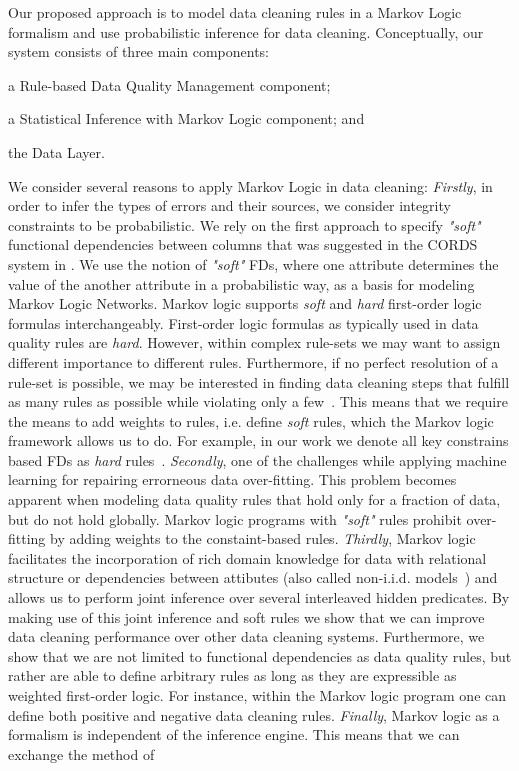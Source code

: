 Our proposed approach is to model data cleaning rules in a Markov Logic~\cite{domingos2009markov} formalism and use probabilistic inference 
for data cleaning. Conceptually, our system consists of three main components: 
\begin{inparaenum}
\item a Rule-based Data Quality Management component;
\item a Statistical Inference with Markov Logic component; and
\item the Data Layer.
\end{inparaenum}
We consider several reasons to apply Markov Logic in data cleaning: \textit{Firstly}, in order to infer the types of errors and their sources, we consider integrity constraints to be probabilistic. We rely on the first approach to specify \textit{"soft"} functional dependencies between columns that was suggested in the \textsc{CORDS} system in \cite{Ilyas:2004:CAD:1007568.1007641}. We use the notion of \textit{"soft"} FDs, where one attribute determines the value of the another attribute in a probabilistic way, as a basis for modeling Markov Logic Networks. Markov logic supports \textit{soft} and \textit{hard} first-order logic formulas interchangeably. First-order logic formulas as typically used in data quality rules are \textit{hard}. However, within complex rule-sets we may want to assign different importance to different rules. Furthermore, if no perfect resolution of a rule-set is possible, we may be interested in finding data cleaning steps that fulfill as many rules as possible while violating only a few~\cite{genesereth1987logical}. This means that we require the means to add weights to rules, i.e. define \textit{soft} rules, which the Markov logic framework allows us to do. For example, in our work we denote all key constrains based FDs as \textit{hard} rules~\cite{bertossi2011database}. \textit{Secondly}, one of the challenges while applying machine learning for repairing errorneous data over-fitting. This problem becomes apparent when modeling data quality rules that hold only for a fraction of data, but do not hold globally. Markov logic programs with \textit{"soft"} rules prohibit over-fitting by adding weights to the constaint-based rules. \textit{Thirdly}, Markov logic facilitates the incorporation of rich domain knowledge for data with relational structure or dependencies between attibutes (also called non-i.i.d. models~\cite{spies2013knowledge}) and allows us to perform joint inference over several interleaved hidden predicates. By making use of this joint inference and soft rules we show that we can improve data cleaning performance over other data cleaning systems. Furthermore, we show that we are not limited to functional dependencies as data quality rules, but rather are able to define arbitrary rules as long as they are expressible as weighted first-order logic. For instance, within the Markov logic program one can define both positive and negative data cleaning rules. \textit{Finally}, Markov logic as a formalism is independent of the inference engine. This means that we can exchange the method of 